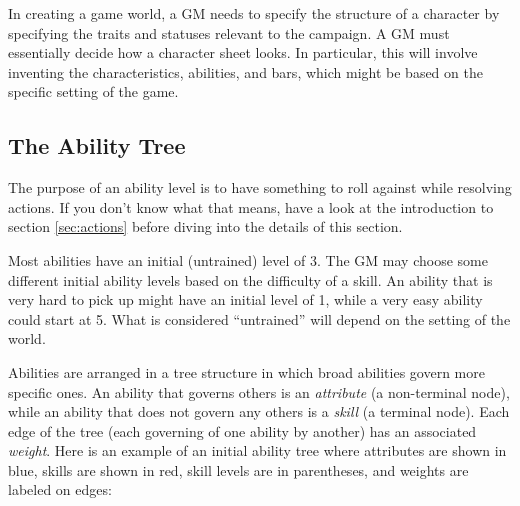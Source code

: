 \documentclass[12pt]{article}
\begin{document}
In creating a game world, a GM needs to specify the structure of a character by specifying the traits and statuses relevant to the campaign. A GM must essentially decide how a character sheet looks. In particular, this will involve inventing the characteristics, abilities, and bars, which might be based on the specific setting of the game.

\subsection{The Ability Tree}\label{sec:tree}			

The purpose of an ability level is to have something to roll against while resolving actions. If you don't know what that means, have a look at the introduction to section \ref{sec:actions} before diving into the details of this section.

Most abilities have an initial (untrained) level of 3. The GM may choose some different initial ability levels based on the difficulty of a skill. An ability that is very hard to pick up might have an initial level of 1, while a very easy ability could start at 5. What is considered ``untrained'' will depend on the setting of the world.

Abilities are arranged in a tree structure in which broad abilities govern more specific ones.
An ability that governs others is an \emph{attribute} (a non-terminal node), while an ability that does not govern any others is a \emph{skill} (a terminal node).
Each edge of the tree (each governing of one ability by another) has an associated \emph{weight}.
Here is an example of an initial ability tree where attributes are shown in blue,
skills are shown in red, skill levels are in parentheses, and weights are labeled on edges:

\end{document}
